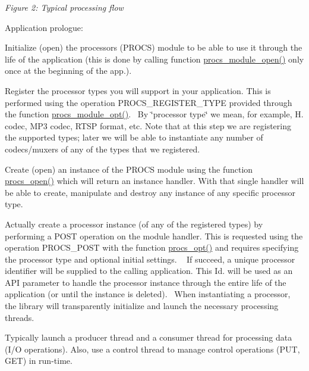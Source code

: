  {\itshape Figure 2\+: Typical processing flow}


\begin{DoxyItemize}
\item Application prologue\+:
\begin{DoxyEnumerate}
\item Initialize (open) the processors (P\+R\+O\+CS) module to be able to use it through the life of the application (this is done by calling function \textquotesingle{}\hyperlink{procs_8c_af5f91a46882b5706b25327384ba347d8}{procs\+\_\+module\+\_\+open()}\textquotesingle{} only once at the beginning of the app.).
\item Register the processor types you will support in your application. This is performed using the operation \textquotesingle{}P\+R\+O\+C\+S\+\_\+\+R\+E\+G\+I\+S\+T\+E\+R\+\_\+\+T\+Y\+PE\textquotesingle{} provided through the function \textquotesingle{}\hyperlink{procs_8c_a226ac6dfd7598a59b9ceab3a92239a80}{procs\+\_\+module\+\_\+opt()}\textquotesingle{}.~\newline
 By \char`\"{}processor type\char`\"{} we mean, for example, H. codec, M\+P3 codec, R\+T\+SP format, etc. Note that at this step we are registering the supported types; later we will be able to instantiate any number of codecs/muxers of any of the types that we registered.
\item Create (open) an instance of the P\+R\+O\+CS module using the function \textquotesingle{}\hyperlink{procs_8c_ac44b6ac931afbeadeb7f07b660e30bac}{procs\+\_\+open()}\textquotesingle{} which will return an instance handler. With that single handler will be able to create, manipulate and destroy any instance of any specific processor type.
\item Actually create a processor instance (of any of the registered types) by performing a P\+O\+ST operation on the module handler. This is requested using the operation \textquotesingle{}P\+R\+O\+C\+S\+\_\+\+P\+O\+ST\textquotesingle{} with the function \textquotesingle{}\hyperlink{procs_8c_a7af2e6f2788006cfc96ca8d811922ffa}{procs\+\_\+opt()}\textquotesingle{} and requires specifying the processor type and optional initial settings. ~\newline
 If succeed, a unique processor identifier will be supplied to the calling application. This Id. will be used as an A\+PI parameter to handle the processor instance through the entire life of the application (or until the instance is deleted).~\newline
 When instantiating a processor, the library will transparently initialize and launch the necessary processing threads.
\item Typically launch a producer thread and a consumer thread for processing data (I/O operations). Also, use a control thread to manage control operations (P\+UT, G\+ET) in run-\/time. ~\newline


\end{DoxyEnumerate}
\end{DoxyItemize}
